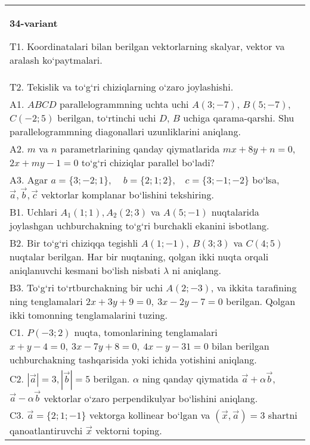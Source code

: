 \documentclass{article}
\begin{document}
\begin{tabular}{m{17cm}}
\textbf{34-variant}

T1. 
Koordinatalari bilan berilgan vektorlarning skalyar, vektor va aralash ko‘paytmalari.
 \\
T2. 
Tekislik va to‘g‘ri chiziqlarning o‘zaro joylashishi.
 \\
A1. 
$ABCD$ parallelogrammning uchta uchi $A (3; -7) $,
$B (5; -7) $, $C (-2; 5) $ berilgan, to‘rtinchi uchi $D$,
$B$ uchiga qarama-qarshi. Shu parallelogrammning diagonallari
uzunliklarini aniqlang.
 \\
A2. 
$m$ va $n$ parametrlarining qanday qiymatlarida
$mx+8y+n=0$, $2x+my-1=0$ to‘g‘ri chiziqlar parallel bo‘ladi?
 \\
A3. 
Agar \(a = \{ 3; - 2;1\},\ \ \ \ \ b = \{ 2;1;2\},\ \ \ \ c = \{ 3; - 1; - 2\}\) bo‘lsa, $\overrightarrow{a}, \overrightarrow{b}, \overrightarrow{c}$ vektorlar komplanar bo‘lishini tekshiring.
 \\
B1. 
Uchlari $A_1 (1; 1), A_2 (2; 3) $ va $A (5;-1) $
nuqtalarida joylashgan uchburchakning to‘g‘ri burchakli ekanini isbotlang.
 \\
B2. 
Bir to‘g‘ri chiziqqa tegishli \(A (1;-1),\ B (3;3) \) va
\(C (4;5) \) nuqtalar berilgan. Har bir nuqtaning, qolgan ikki nuqta orqali aniqlanuvchi kesmani bo‘lish nisbati $\lambda$ ni aniqlang.
 \\
B3. 
To‘g‘ri to‘rtburchakning bir uchi \(A (2;-3) \), va ikkita tarafining
ning tenglamalari \(2x+3y+9=0,\ 3x-2y-7=0\)
berilgan. Qolgan ikki tomonning tenglamalarini tuzing.
 \\
C1. 
\(P (-3;2) \) nuqta, tomonlarining tenglamalari
\(x+y-4=0,\ 3x-7y+8=0,\ 4x-y-31=0\) bilan
berilgan uchburchakning tashqarisida yoki ichida yotishini aniqlang.
 \\
C2. 
$|\vec{a}| = 3,|\vec{b}| = 5$ berilgan. $\alpha$ ning qanday qiymatida $\vec{a} + \alpha\vec{b}$, $\vec{a} - \alpha\vec{b}$ vektorlar o‘zaro perpendikulyar bo‘lishini aniqlang.
 \\
C3. 
$\vec{a} = \{ 2;1; - 1\}$ vektorga kollinear bo‘lgan va $\left(\vec{x},\vec{a} \right) = 3$ shartni qanoatlantiruvchi $\vec{x}$ vektorni toping.
 \\

\end{tabular}
\vspace{1cm}
\end{document}
